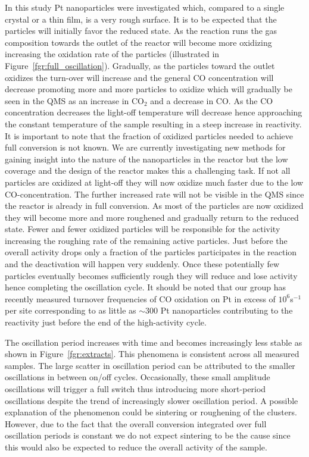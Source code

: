 \documentclass[8.5pt,twoside,twocolumn]{article}
\begin{document}
In this study Pt nanoparticles were investigated which, compared to a single crystal or a thin film, is a very rough surface. It is to be expected that the particles will initially favor the reduced state. As the reaction runs the gas composition towards the outlet of the reactor will become more oxidizing increasing the oxidation rate of the particles (illustrated in Figure~\ref{fgr:full_oscillation}). Gradually, as the particles toward the outlet oxidizes the turn-over will increase and the general CO concentration will decrease promoting more and more particles to oxidize which will gradually be seen in the QMS as an increase in CO$_2$ and a decrease in CO. As the CO concentration decreases the light-off temperature will decrease hence approaching the constant temperature of the sample resulting in a steep increase in reactivity. It is important to note that the fraction of oxidized particles needed to achieve full conversion is not known. We are currently investigating new methods for gaining insight into the nature of the nanoparticles in the reactor but the low coverage and the design of the reactor makes this a challenging task. If not all particles are oxidized at light-off they will now oxidize much faster due to the low CO-concentration. The further increased rate will not be visible in the QMS since the reactor is already in full conversion. As most of the particles are now oxidized they will become more and more roughened and gradually return to the reduced state. Fewer and fewer oxidized particles will be responsible for the activity increasing the roughing rate of the remaining active particles. Just before the overall activity drops only a fraction of the particles participates in the reaction and the deactivation will happen very suddenly. Once these potentially few particles eventually becomes sufficiently rough they will reduce and lose activity hence completing the oscillation cycle. It should be noted that our group has recently measured turnover frequencies of CO oxidation on Pt in excess of $10^{6}$s$^{-1}$ per site corresponding to as little as $\sim$300 Pt nanoparticles contributing to the reactivity just before the end of the high-activity cycle.

The oscillation period increases with time and becomes increasingly less stable as shown in Figure~\ref{fgr:extracts}. This phenomena is consistent across all measured samples. The large scatter in oscillation period can be attributed to the smaller oscillations in between on/off cycles. Occasionally, these small amplitude oscillations will trigger a full switch thus introducing more short-period oscillations despite the trend of increasingly slower oscillation period. A possible explanation of the phenomenon could be sintering or roughening of the clusters. However, due to the fact that the overall conversion integrated over full oscillation periods is constant we do not expect sintering to be the cause since this would also be expected to reduce the overall activity of the sample.
\end{document}
